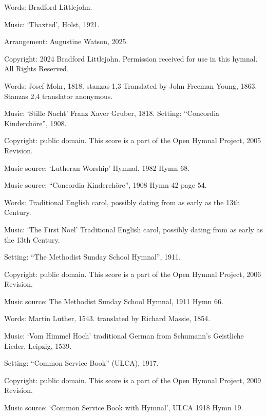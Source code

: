 \begin{multicols}{2}
\par\noindent
Words: Bradford Littlejohn.
\par\noindent
Music: `Thaxted', Holst, 1921.
\par\noindent
Arrangement: Augustine Watson, 2025.
\par\noindent
Copyright: 2024 Bradford Littlejohn. Permission received for use in this hymnal.  All Rights Reserved.

\par\noindent
Words: Josef Mohr, 1818. stanzas 1,3 Translated by John Freeman Young, 1863. Stanzas 2,4 translator anonymous.
\par\noindent
Music: `Stille Nacht' Franz Xaver Gruber, 1818.  Setting: ``Concordia Kinderchöre'', 1908.
\par\noindent
Copyright: public domain. This score is a part of the Open Hymnal Project, 2005 Revision.
\par\noindent
Music source: `Lutheran Worship' Hymnal, 1982 Hymn 68.
\par\noindent
Music source: ``Concordia Kinderchöre'', 1908 Hymn 42 page 54.

\par\noindent
Words: Traditional English carol, possibly dating from as early as the 13th Century.
\par\noindent
Music: `The First Noel' Traditional English carol, possibly dating from as early as the 13th Century.
\par\noindent
Setting: ``The Methodist Sunday School Hymnal'', 1911.
\par\noindent
Copyright: public domain. This score is a part of the Open Hymnal Project, 2006 Revision.
\par\noindent
Music source: The Methodist Sunday School Hymnal, 1911 Hymn 66.

\par\noindent
Words: Martin Luther, 1543. translated by Richard Massie, 1854. 
\par\noindent
Music: `Vom Himmel Hoch' traditional German from Schumann's Geistliche Lieder, Leipzig, 1539. 
\par\noindent
Setting: ``Common Service Book'' (ULCA), 1917.
\par\noindent
Copyright: public domain. This score is a part of the Open Hymnal Project, 2009 Revision.
\par\noindent
Music source: `Common Service Book with Hymnal', ULCA 1918 Hymn 19.


\end{multicols}
